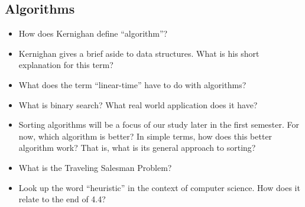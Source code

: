 \documentclass[12pt]{article}
\begin{document}
\subsection*{Algorithms}
\begin{itemize}
	\item How does Kernighan define ``algorithm''?
	\item Kernighan gives a brief aside to data structures. What is his short explanation for this term?
	\item What does the term ``linear-time'' have to do with algorithms?
	\item What is binary search? What real world application does it have?
	\item Sorting algorithms will be a focus of our study later in the first semester. For now, which algorithm is better? In simple terms, how does this better algorithm work? That is, what is its general approach to sorting?
	\item What is the Traveling Salesman Problem?
	\item Look up the word ``heuristic'' in the context of computer science. How does it relate to the end of 4.4?
\end{itemize}
\end{document}
